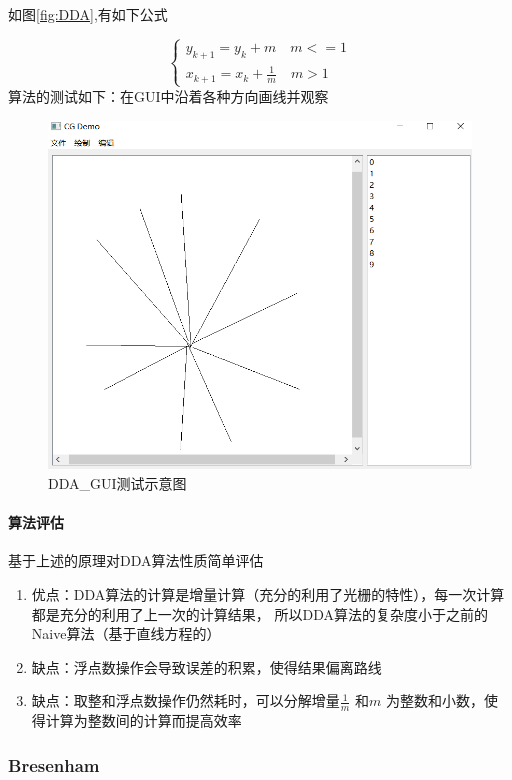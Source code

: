 \documentclass[a4paper,UTF8]{article}
\theoremstyle{definition}
\begin{document}
如图\ref{fig:DDA},有如下公式

$$
\begin{cases}
    y_{k+1}=y_k + m \quad \text{$m<=1$}\\
    x_{k+1}=x_k + \frac{1}{m} \quad \text{$m>1$}
\end{cases}
$$
算法的测试如下：在GUI中沿着各种方向画线并观察\\
\begin{figure}[h]
	\centering
	\includegraphics[scale=0.4]{figure/DDA_GUI.png}
	\caption{DDA\_GUI测试示意图}
	\label{fig:DDA_GUI}
\end{figure}

\paragraph{算法评估} 
基于上述的原理对DDA算法性质简单评估
\begin{enumerate}
    \item 优点：DDA算法的计算是增量计算（充分的利用了光栅的特性），每一次计算都是充分的利用了上一次的计算结果，
    所以DDA算法的复杂度小于之前的Naive算法（基于直线方程的）
    \item 缺点：浮点数操作会导致误差的积累，使得结果偏离路线
    \item 缺点：取整和浮点数操作仍然耗时，可以分解增量$\frac{1}{m}$ 和$m$ 为整数和小数，使得计算为整数间的计算而提高效率
\end{enumerate}


\subsubsection{Bresenham}
\end{document}
